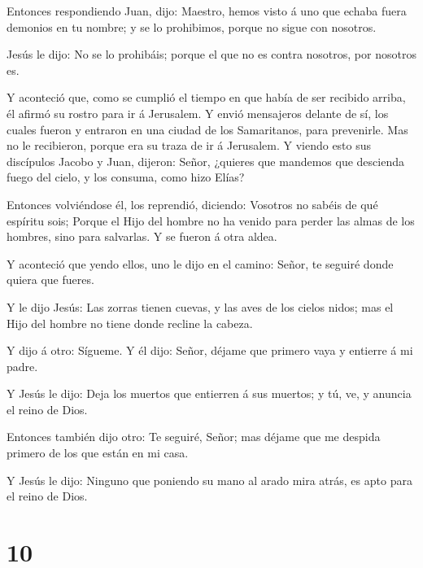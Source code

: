  Entonces respondiendo Juan, dijo: Maestro, hemos visto á
uno que echaba fuera demonios en tu nombre; y se lo prohibimos, porque
no sigue con nosotros.

 Jesús le dijo: No se lo prohibáis; porque el que no es
contra nosotros, por nosotros es.

 Y aconteció que, como se cumplió el tiempo en que había de
ser recibido arriba, él afirmó su rostro para ir á Jerusalem.
 Y envió mensajeros delante de sí, los cuales fueron y
entraron en una ciudad de los Samaritanos, para prevenirle.
 Mas no le recibieron, porque era su traza de ir á
Jerusalem.  Y viendo esto sus discípulos Jacobo y Juan,
dijeron: Señor, ¿quieres que mandemos que descienda fuego del cielo, y
los consuma, como hizo Elías?

 Entonces volviéndose él, los reprendió, diciendo: Vosotros
no sabéis de qué espíritu sois;  Porque el Hijo del hombre
no ha venido para perder las almas de los hombres, sino para salvarlas.
Y se fueron á otra aldea.

 Y aconteció que yendo ellos, uno le dijo en el camino:
Señor, te seguiré donde quiera que fueres.

 Y le dijo Jesús: Las zorras tienen cuevas, y las aves de
los cielos nidos; mas el Hijo del hombre no tiene donde recline la
cabeza.

 Y dijo á otro: Sígueme. Y él dijo: Señor, déjame que
primero vaya y entierre á mi padre.

 Y Jesús le dijo: Deja los muertos que entierren á sus
muertos; y tú, ve, y anuncia el reino de Dios.

 Entonces también dijo otro: Te seguiré, Señor; mas déjame
que me despida primero de los que están en mi casa.

 Y Jesús le dijo: Ninguno que poniendo su mano al arado
mira atrás, es apto para el reino de Dios.

\hypertarget{section-9}{%
\section{10}\label{section-9}}

